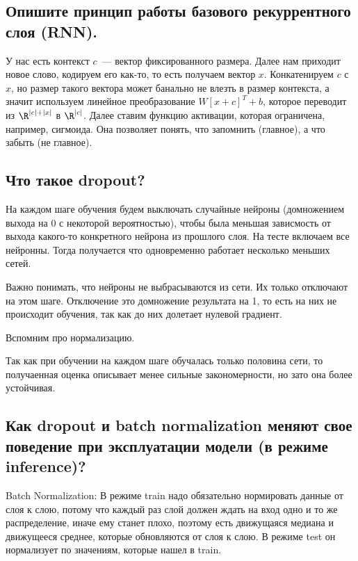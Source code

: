 \subsection{Опишите принцип работы базового рекуррентного слоя (RNN).}

У нас есть контекст $c$~--- вектор фиксированного размера. Далее нам приходит новое слово, кодируем его как-то, то есть получаем вектор $x$. Конкатенируем $c$ с $x$, но размер такого вектора может банально не влезть в размер контекста, а значит используем линейное преобразование $W[x + c]^T + b$, которое переводит из $\R^{|c| + |x|}$ в $\R^{|c|}$. Далее ставим функцию активации, которая ограничена, например, сигмоида. Она позволяет понять, что запомнить (главное), а что забыть (не главное).









\subsection{Что такое dropout?}

На каждом шаге обучения будем выключать случайные нейроны (домножением выхода на 0 с некоторой вероятностью), чтобы была меньшая зависмость от выхода какого-то конкретного нейрона из прошлого слоя. На тесте включаем все нейронны. Тогда получается что одновременно работает несколько меньших сетей. 

Важно понимать, что нейроны не выбрасываются из сети. Их только отключают на этом шаге. Отключение это домножение результата на 1, то есть на них не происходит обучения, так как до них долетает нулевой градиент.

Вспомним про  нормализацию. 

Так как при обучении на каждом шаге обучалась только половина сети, то получаенная  оценка описывает менее сильные закономерности, но зато она более устойчивая.







\subsection{Как dropout и batch normalization меняют свое поведение при эксплуатации модели (в
режиме inference)?}

Batch Normalization: В режиме train надо обязательно нормировать данные от слоя к слою, потому что каждый раз слой должен ждать на вход одно и то же распределение, иначе ему станет плохо, поэтому есть движущаяся медиана и движущееся среднее, которые обновляются от слоя к слою. В режиме test он нормализует по значениям, которые нашел в train.

